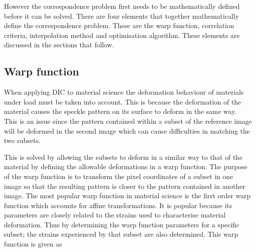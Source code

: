 \documentclass[12pt,oneside,openany,a4paper, %
english, %
masters-t, goldenblock]{usthesis}
\begin{document}

However the correspondence problem first needs to be mathematically defined before it can be solved. There are four elements that together mathematically define the correspondence problem. These are the warp function, correlation criteria, interpolation method and optimisation algorithm. These elements are discussed in the sections that follow.





\subsection{Warp function}

When applying DIC to material science the deformation behaviour of materials under load must be taken into account. This is because the deformation of the material causes the speckle pattern on its surface to deform in the same way. This is an issue since the pattern contained within a subset of the reference image will be deformed in the second image which can cause difficulties in matching the two subsets.

This is solved by allowing the subsets to deform in a similar way to that of the material by defining the allowable deformations in a warp function. The purpose of the warp function is to transform the pixel coordinates of a subset in one image so that the resulting pattern is closer to the pattern contained in another image. The most popular warp function in material science is the first order warp function which accounts for affine transformations. It is popular because its parameters are closely related to the strains used to characterise material deformation. Thus by determining the warp function parameters for a specific subset; the strains experienced by that subset are also determined. This warp function is given as
\end{document}
